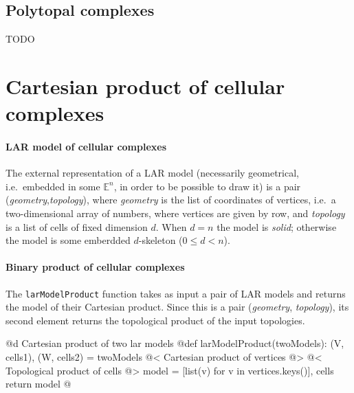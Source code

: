 \documentclass[11pt,oneside]{article}	%
\def\E{\mathbb{E}}
\begin{document}
\subsection{Polytopal complexes}

TODO

\section{Cartesian product of cellular complexes}
\label{sec:product}

\paragraph{LAR model of cellular complexes}

The external representation of a LAR model (necessarily geometrical, i.e.~embedded in some $\E^n$, in order to be possible to draw it) is a pair (\emph{geometry},\emph{topology}), where \emph{geometry} is the list of coordinates of vertices, i.e.~a two-dimensional array of numbers, where vertices are given by row, and \emph{topology} is a list of cells of fixed dimension $d$. When $d=n$ the model is \emph{solid}; otherwise  the model is some emberdded $d$-skeleton ($0\leq d <n$).

\paragraph{Binary product of cellular complexes}
The \texttt{larModelProduct} function takes as input a pair of LAR models and returns the model of their Cartesian product. Since this is a pair (\emph{geometry}, \emph{topology}), its second element returns the topological product of the input topologies.

@d Cartesian product of two lar models  
@{def larModelProduct(twoModels):
    (V, cells1), (W, cells2) = twoModels
    @< Cartesian product of vertices @>
    @< Topological product of cells    @>
    model = [list(v) for v in vertices.keys()], cells
    return model
@}
\end{document}
